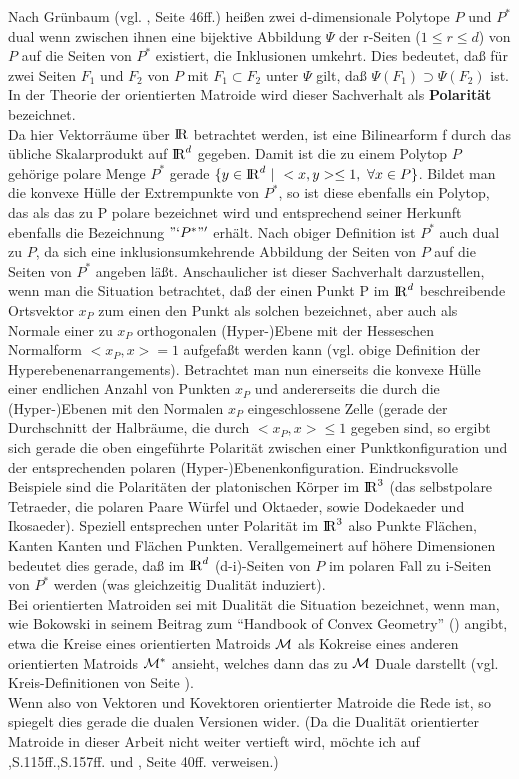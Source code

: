 Nach Grünbaum (vgl. \cite{Gr:67}, Seite 46ff.) heißen zwei d-dimensionale
Polytope $P$ und $P^*$ dual wenn zwischen ihnen eine bijektive
Abbildung $\Psi$ der r-Seiten ($1\leq r\leq d$) von $P$ auf die Seiten von
$P^*$ existiert, die Inklusionen umkehrt. Dies bedeutet, daß für zwei Seiten
$F_1$ und $F_2$ von $P$ mit $F_1\subset F_2$ unter $\Psi$ gilt, daß
$\Psi(F_1)\supset\Psi(F_2)$ ist. In der Theorie der orientierten Matroide
wird dieser Sachverhalt als {\bf Polarität} bezeichnet.\\
Da hier Vektorräume über $\mbox{$\rm I\!R$}$ betrachtet werden, ist eine Bilinearform f
durch das übliche Skalarprodukt auf $\mbox{$\rm I\!R$}^d$ gegeben. Damit ist die zu einem
Polytop $P$ gehörige polare Menge $P^*$ gerade
$\{y\in\mbox{$\rm I\!R$}^d~|~<x,y>\leq 1,~\forall x\in P\}$.
Bildet man die konvexe Hülle der Extrempunkte von $P^*$, so ist diese ebenfalls
ein Polytop, das als das zu P polare bezeichnet wird und entsprechend seiner
Herkunft ebenfalls die Bezeichnung $"`P^*"'$ erhält. Nach obiger Definition ist
$P^*$ auch dual zu $P$, da sich eine inklusionsumkehrende Abbildung der
Seiten von $P$ auf die Seiten von $P^*$ angeben läßt. Anschaulicher ist dieser
Sachverhalt darzustellen, wenn man die Situation betrachtet, daß der einen
Punkt P im $\mbox{$\rm I\!R$}^d$ beschreibende Ortsvektor $x_P$ zum einen den Punkt als solchen
bezeichnet, aber auch als Normale einer zu $x_P$ orthogonalen (Hyper-)Ebene mit
der Hesseschen Normalform $<x_P,x>=1$ aufgefaßt werden kann (vgl. obige
Definition der Hyperebenenarrangements). Betrachtet man nun einerseits die
konvexe Hülle einer endlichen Anzahl von Punkten $x_P$ und andererseits die
durch die (Hyper-)Ebenen mit den Normalen $x_P$ eingeschlossene Zelle
(gerade der Durchschnitt der Halbräume, die durch $<x_P,x>\leq 1$ gegeben sind,
so ergibt sich gerade die oben eingeführte Polarität zwischen einer
Punktkonfiguration und der entsprechenden polaren (Hyper-)Ebenenkonfiguration.
\label{polar} Eindrucksvolle Beispiele sind die Polaritäten der platonischen
Körper im $\mbox{$\rm I\!R$}^3$ (das selbstpolare Tetraeder, die polaren Paare Würfel und
Oktaeder, sowie Dodekaeder und Ikosaeder).
Speziell entsprechen unter Polarität im $\mbox{$\rm I\!R$}^3$ also Punkte Flächen, Kanten
Kanten und Flächen Punkten. Verallgemeinert auf höhere Dimensionen
bedeutet dies gerade, daß im $\mbox{$\rm I\!R$}^d$ (d-i)-Seiten von $P$ im polaren Fall zu
i-Seiten von $P^*$ werden (was gleichzeitig Dualität induziert).\\
Bei orientierten Matroiden sei mit Dualität die Situation
bezeichnet, wenn man, wie Bokowski in seinem Beitrag zum "`Handbook of Convex
Geometry"' (\cite{Bo:93}) angibt, etwa die Kreise eines orientierten Matroids
$\cal M$ als Kokreise eines anderen orientierten Matroids $\cal M^*$ ansieht,
welches dann das zu $\cal M$ Duale darstellt (vgl. Kreis-Definitionen von
Seite \pageref{kokreis}).\\
Wenn also von Vektoren und Kovektoren orientierter Matroide die Rede ist, so
spiegelt dies gerade die dualen Versionen wider. (Da die Dualität orientierter
Matroide in dieser Arbeit nicht weiter vertieft wird, möchte ich auf
\cite{Bj:93},S.115ff.,S.157ff. und \cite{Schu:92}, Seite 40ff. verweisen.)

